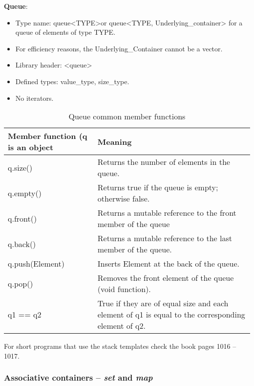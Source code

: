 \noindent
\textbf{Queue}:
\begin{itemize}
	\item Type name: queue\textless TYPE\textgreater or queue\textless TYPE, Underlying\_container\textgreater
	for a queue of elements of type TYPE.
	\item For efficiency reasons, the Underlying\_Container cannot be a vector.
	\item Library header: \textless queue\textgreater
	\item Defined types: value\_type, size\_type.
	\item No iterators.
\end{itemize}
\begin{table}[H]
\begin{center}
\renewcommand{\arraystretch}{1.8}
\begin{tabular}{ m{4.5cm} m{11cm}} 
\textbf{Member function (q is an object} & \textbf{Meaning}\\
\hline

q.size() & Returns the number of elements in the queue.\\
\hline

q.empty() & Returns true if the queue is empty; otherwise false.\\
\hline

q.front() & Returns a mutable reference to the front member of the queue\\
\hline

q.back() & Returns a mutable reference to the last member of the queue.\\
\hline

q.push(Element) & Inserts Element at the back of the queue.\\
\hline

q.pop() & Removes the front element of the queue (void function).\\
\hline

q1 == q2 & True if they are of equal size and each element of q1 is
equal to the corresponding element of q2.\\
\hline
\end{tabular}
\end{center}
\caption{Queue common member functions}
\label{table_1}
\end{table}

For short programs that use the stack templates check the book pages
1016 -- 1017.




\subsubsection{Associative containers -- \emph{set} and \emph{map}}

